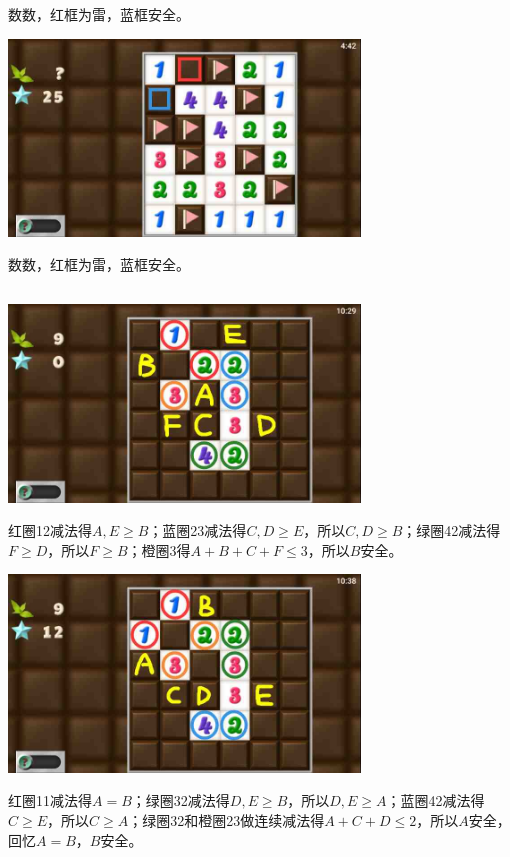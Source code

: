 数数，红框为雷，蓝框安全。
\begin{center}
    \includegraphics[width=0.7\textwidth]{puzzlelow/210-5.jpg}
\end{center}
数数，红框为雷，蓝框安全。

\subsection{} %
\begin{center}
    \includegraphics[width=0.7\textwidth]{puzzlelow/211-1.jpg}
\end{center}
红圈12减法得$A,E\ge B$；蓝圈23减法得$C,D\ge E$，所以$C,D\ge B$；绿圈42减法得$F\ge D$，所以$F\ge B$；橙圈3得$A+B+C+F\le 3$，所以$B$安全。
\begin{center}
    \includegraphics[width=0.7\textwidth]{puzzlelow/211-2.jpg}
\end{center}
红圈11减法得$A=B$；绿圈32减法得$D,E\ge B$，所以$D,E\ge A$；蓝圈42减法得$C\ge E$，所以$C\ge A$；绿圈32和橙圈23做连续减法得$A+C+D\le 2$，所以$A$安全，回忆$A=B$，$B$安全。

